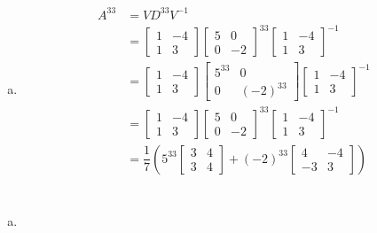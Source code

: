 \documentclass[12pt]{article}
\begin{document}
\begin{enumerate}[(a)]
	\item 
		\begin{align*}
			A^{33} &= VD^{33}V^{-1}\\
			&= 
				\begin{bmatrix}
					1 & -4\\
					1 & 3
				\end{bmatrix}
				\begin{bmatrix}
					5 & 0\\
					0 & -2
				\end{bmatrix}^{33}
				\begin{bmatrix}
					1 & -4\\
					1 & 3
				\end{bmatrix}^{-1}\\
			&= 
				\begin{bmatrix}
					1 & -4\\
					1 & 3
				\end{bmatrix}
				\begin{bmatrix}
					5^{33} & 0\\
					0 & (-2)^{33}
				\end{bmatrix}
				\begin{bmatrix}
					1 & -4\\
					1 & 3
				\end{bmatrix}^{-1}\\
			&= 
				\begin{bmatrix}
					1 & -4\\
					1 & 3
				\end{bmatrix}
				\begin{bmatrix}
					5 & 0\\
					0 & -2
				\end{bmatrix}^{33}
				\begin{bmatrix}
					1 & -4\\
					1 & 3
				\end{bmatrix}^{-1}\\
			&= 
				\dfrac{1}{7} \left( 5^{33}
				\begin{bmatrix}
					3 & 4\\
					3 & 4
				\end{bmatrix}
				+ (-2)^{33}
				\begin{bmatrix}
					4 & -4\\
					-3 & 3
				\end{bmatrix}
				\right)
		\end{align*}
\end{enumerate}
\newpage

\section{}
\begin{enumerate}[(a)]
	\item 
\end{enumerate}
\end{document}
